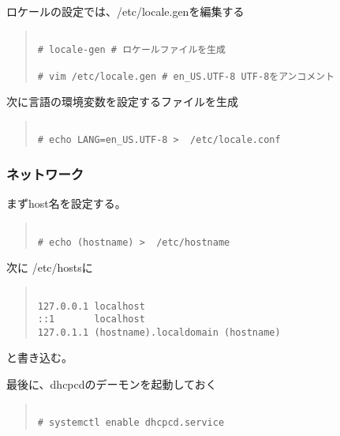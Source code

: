 \documentclass[dvipdfmx]{jsarticle}
\begin{document}
ロケールの設定では、/etc/locale.genを編集する

\begin{quote}
\begin{verbatim}

# locale-gen # ロケールファイルを生成

# vim /etc/locale.gen # en_US.UTF-8 UTF-8をアンコメント

\end{verbatim}
\end{quote}


次に言語の環境変数を設定するファイルを生成

\begin{quote}
\begin{verbatim}

# echo LANG=en_US.UTF-8 >  /etc/locale.conf

\end{verbatim}
\end{quote}

\subsubsection{ネットワーク}

まずhost名を設定する。

\begin{quote}
\begin{verbatim}

# echo (hostname) >  /etc/hostname

\end{verbatim}
\end{quote}

次に /etc/hostsに

\begin{quote}
\begin{verbatim}

127.0.0.1 localhost
::1       localhost
127.0.1.1 (hostname).localdomain (hostname)

\end{verbatim}
\end{quote}

と書き込む。

最後に、dhcpcdのデーモンを起動しておく

\begin{quote}
\begin{verbatim}

# systemctl enable dhcpcd.service

\end{verbatim}
\end{quote}
\end{document}
